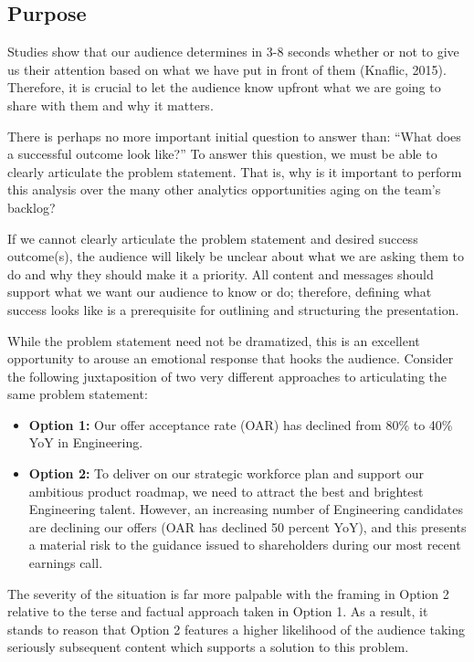 \documentclass[
]{book}
\begin{document}
\hypertarget{purpose}{%
\subsection{Purpose}\label{purpose}}

Studies show that our audience determines in 3-8 seconds whether or not to give us their attention based on what we have put in front of them (Knaflic, 2015). Therefore, it is crucial to let the audience know upfront what we are going to share with them and why it matters.

There is perhaps no more important initial question to answer than: ``What does a successful outcome look like?'' To answer this question, we must be able to clearly articulate the problem statement. That is, why is it important to perform this analysis over the many other analytics opportunities aging on the team's backlog?

If we cannot clearly articulate the problem statement and desired success outcome(s), the audience will likely be unclear about what we are asking them to do and why they should make it a priority. All content and messages should support what we want our audience to know or do; therefore, defining what success looks like is a prerequisite for outlining and structuring the presentation.

While the problem statement need not be dramatized, this is an excellent opportunity to arouse an emotional response that hooks the audience. Consider the following juxtaposition of two very different approaches to articulating the same problem statement:

\begin{itemize}
\item
  \textbf{Option 1:} Our offer acceptance rate (OAR) has declined from 80\% to 40\% YoY in Engineering.
\item
  \textbf{Option 2:} To deliver on our strategic workforce plan and support our ambitious product roadmap, we need to attract the best and brightest Engineering talent. However, an increasing number of Engineering candidates are declining our offers (OAR has declined 50 percent YoY), and this presents a material risk to the guidance issued to shareholders during our most recent earnings call.
\end{itemize}

The severity of the situation is far more palpable with the framing in Option 2 relative to the terse and factual approach taken in Option 1. As a result, it stands to reason that Option 2 features a higher likelihood of the audience taking seriously subsequent content which supports a solution to this problem.
\end{document}
